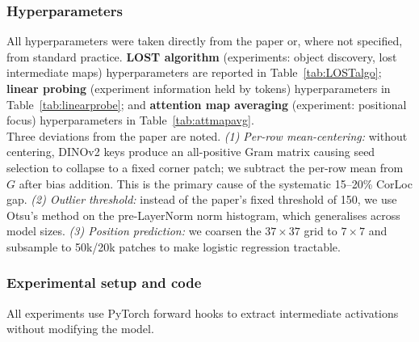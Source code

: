 \subsubsection{Hyperparameters}
All hyperparameters were taken directly from the paper or, where not specified, from standard practice.
\textbf{LOST algorithm} (experiments: object discovery, lost intermediate maps) hyperparameters are reported in Table~\ref{tab:LOSTalgo};
\textbf{linear probing} (experiment information held by tokens) hyperparameters in Table~\ref{tab:linearprobe};
and \textbf{attention map averaging} (experiment: positional focus) hyperparameters in Table~\ref{tab:attmapavg}.\\
Three deviations from the paper are noted.
\textit{(1) Per-row mean-centering:} without centering, DINOv2 keys produce an all-positive Gram matrix
causing seed selection to collapse to a fixed corner patch; we subtract the per-row mean from $G$ after
bias addition. This is the primary cause of the systematic 15--20\% CorLoc gap.
\textit{(2) Outlier threshold:} instead of the paper's fixed threshold of 150, we use Otsu's method on the
pre-LayerNorm norm histogram, which generalises across model sizes.
\textit{(3) Position prediction:} we coarsen the $37{\times}37$ grid to $7{\times}7$ and subsample to
50k/20k patches to make logistic regression tractable.

\subsubsection{Experimental setup and code}
All experiments use PyTorch forward hooks to extract intermediate activations without modifying the model.

